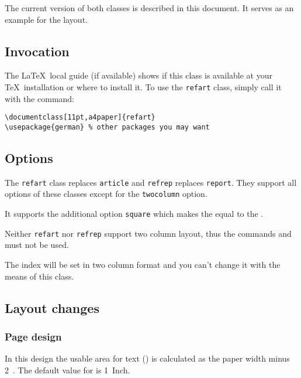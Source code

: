 The current version of both classes is described in this document. It 
serves as an example for the layout.


\subsection{Invocation}

The \LaTeX\ local guide (if available) shows if this class is available 
at your \TeX\ installation or where to install it.  To use the 
\texttt{refart} class, simply call it with the  
command:

\begin{verbatim}
\documentclass[11pt,a4paper]{refart}
\usepackage{german} % other packages you may want 
\end{verbatim}

\subsection{Options}

The \texttt{refart} class replaces \texttt{article} and \texttt{refrep} 
replaces \texttt{report}. They support all options of these classes 
except for the \texttt{twocolumn} option.

It supports the additional option \texttt{square} which makes the
 equal to the . 

Neither \texttt{refart} nor \texttt{refrep} support two column layout, thus
the commands  and  must not be used.

The index will be set in two column format and you can't change it 
with the means of this class. 

\subsection{Layout changes}

\subsubsection{Page design}

In this design the usable area for text () is 
calculated as the paper width minus 2~. The default
value for  is 1~Inch.

